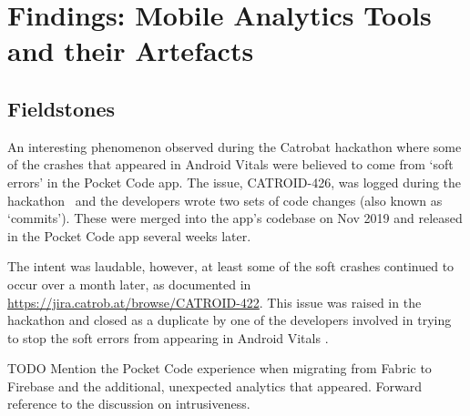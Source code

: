 \setchapterpreamble[u]{\margintoc}
\chapter{Findings: Mobile Analytics Tools and their Artefacts}

\section{Fieldstones}

An interesting phenomenon observed during the Catrobat hackathon where some of the crashes that appeared in Android Vitals were believed to come from `soft errors' in the Pocket Code app. The issue, CATROID-426, was logged during the hackathon~ and the developers wrote two sets of code changes (also known as `commits'). These were merged into the app's codebase on  Nov 2019 and released in the Pocket Code app several weeks later.

The intent was laudable, however, at least some of the soft crashes continued to occur over a month later, as documented in \url{https://jira.catrob.at/browse/CATROID-422}. This issue was raised in the hackathon and closed as a duplicate by one of the developers involved in trying to stop the soft errors from appearing in Android Vitals .

TODO Mention the Pocket Code experience when migrating from Fabric to Firebase and the additional, unexpected analytics that appeared. Forward reference to the discussion on intrusiveness.